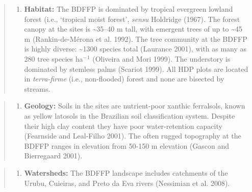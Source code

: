 \documentclass[
  man, donotrepeattitle,floatsintext]{apa6}
\providecommand{\tightlist}{%
  \setlength{\itemsep}{0pt}\setlength{\parskip}{0pt}}
\begin{document}
\begin{quote}
\begin{enumerate}
\def\labelenumi{\alph{enumi}.}
\setcounter{enumi}{2}
\tightlist
\item
  \textbf{Habitat:} The BDFFP is dominated by tropical evergreen lowland forest (i.e., `tropical moist forest', \emph{sensu} Holdridge (1967). The forest canopy at the sites is \textasciitilde35--40 m tall, with emergent trees of up to \textasciitilde45 m (Rankin-de-Mérona et al. 1992). The tree community at the BDFFP is highly diverse: \textasciitilde1300 species total (Laurance 2001), with as many as 280 tree species ha\(^-\)\(^1\) (Oliveira and Mori 1999). The understory is dominated by stemless palms (Scariot 1999). All HDP plots are located in \emph{terra-firme} (i.e., non-flooded) forest and none are bisected by streams.
\end{enumerate}
\end{quote}

\begin{quote}
\begin{enumerate}
\def\labelenumi{\alph{enumi}.}
\setcounter{enumi}{3}
\tightlist
\item
  \textbf{Geology:} Soils in the sites are nutrient-poor xanthic ferralsols, known as yellow latosols in the Brazilian soil classification system. Despite their high clay content they have poor water-retention capacity (Fearnside and Leal-Filho 2001). The often rugged topography at the BDFFP ranges in elevation from 50-150 m elevation (Gascon and Bierregaard 2001).
\end{enumerate}
\end{quote}

\begin{quote}
\begin{enumerate}
\def\labelenumi{\alph{enumi}.}
\setcounter{enumi}{4}
\tightlist
\item
  \textbf{Watersheds:} The BDFFP landscape includes catchments of the Urubu, Cuieiras, and Preto da Eva rivers (Nessimian et al. 2008).
\end{enumerate}
\end{quote}
\end{document}
